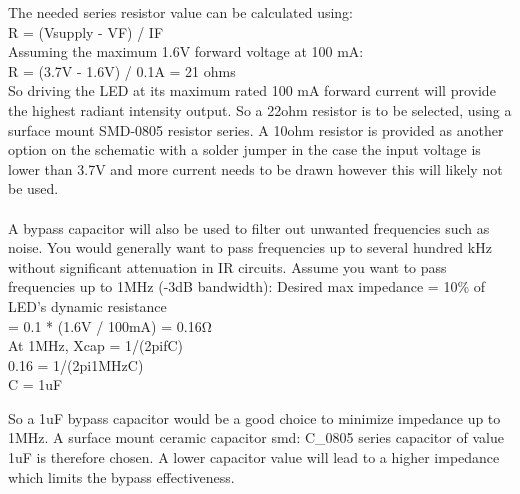 \documentclass[class=report,11pt,crop=false]{standalone}
\begin{document}
The needed series resistor value can be calculated using:\\
R = (Vsupply - VF) / IF\\
Assuming the maximum 1.6V forward voltage at 100 mA:\\
R = (3.7V - 1.6V) / 0.1A = 21 ohms
\\
So driving the LED at its maximum rated 100 mA forward current will provide the highest radiant intensity output. So a 22ohm resistor is to be selected, using a surface mount SMD-0805 resistor series. A 10ohm resistor is provided as another option on the schematic with a solder jumper in the case the input voltage is lower than 3.7V and more current needs to be drawn however this will likely not be used.
\\\\
A bypass capacitor will also be used to filter out unwanted frequencies such as noise. You would generally want to pass frequencies up to several hundred kHz without significant attenuation in IR circuits.
Assume you want to pass frequencies up to 1MHz (-3dB bandwidth):
Desired max impedance = 10\% of LED's dynamic resistance \\
= 0.1 * (1.6V / 100mA) = 0.16Ω \\
At 1MHz, Xcap = 1/(2pifC) \\
0.16 = 1/(2pi1MHzC) \\
C = 1uF

So a 1uF bypass capacitor would be a good choice to minimize impedance up to 1MHz. A surface mount ceramic capacitor smd: C\_0805 series capacitor of value 1uF is therefore chosen. A lower capacitor value will lead to a higher impedance which limits the bypass effectiveness.
\end{document}

